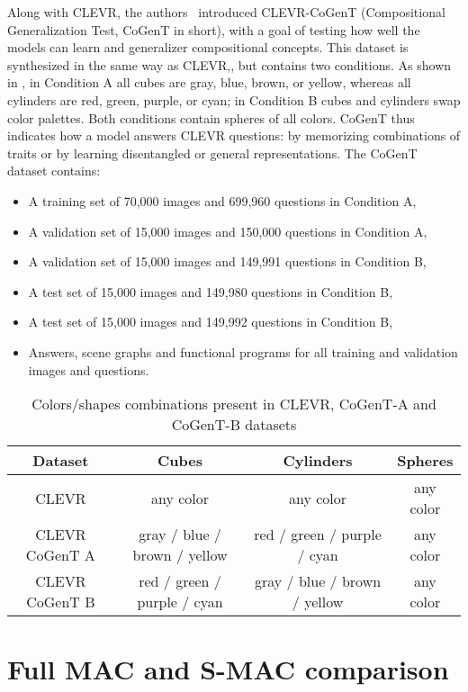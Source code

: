 Along with CLEVR, the authors~\cite{johnson2017clevr} introduced  CLEVR-CoGenT (Compositional Generalization Test, CoGenT in short), with a goal of testing how well the models can learn and generalizer compositional concepts.
This dataset is synthesized in the same way as CLEVR,, but contains two conditions.
As shown in , in Condition A all cubes are gray, blue, brown, or yellow, whereas all cylinders are red, green, purple, or cyan; in Condition B cubes and cylinders swap color palettes.
Both conditions contain spheres of all colors.
CoGenT thus indicates how a model answers CLEVR questions: by memorizing combinations of traits or by learning disentangled or general representations.
The CoGenT dataset contains:
\begin{itemize}
\item	A training set of 70,000 images and 699,960 questions in Condition A,
\item	A validation set of 15,000 images and 150,000 questions in Condition A,
\item	A validation set of 15,000 images and 149,991 questions in Condition B,
\item	A test set of 15,000 images and 149,980 questions in Condition B,
\item	A test set of 15,000 images and 149,992 questions in Condition B,
\item	Answers, scene graphs and functional programs for all training and validation images and questions.
\end{itemize}

\begin{table}[h!]
	\centering
	\begin{tabular}{cccc}
		\toprule
		Dataset        & Cubes              & Cylinders &  Spheres         \\
		\midrule
		CLEVR   &  any color &  any color        &    any color    \\
		CLEVR CoGenT A & gray / blue / brown / yellow  & red / green / purple / cyan       &    any color  \\
		CLEVR CoGenT B  & red / green / purple / cyan &   gray / blue / brown / yellow       &      any color  \\
		\bottomrule
	\end{tabular}
	\caption{Colors/shapes combinations present in CLEVR, CoGenT-A and CoGenT-B datasets}
	\label{tab:cogent_conditions}
\end{table}

 
\section{Full MAC and S-MAC comparison}

